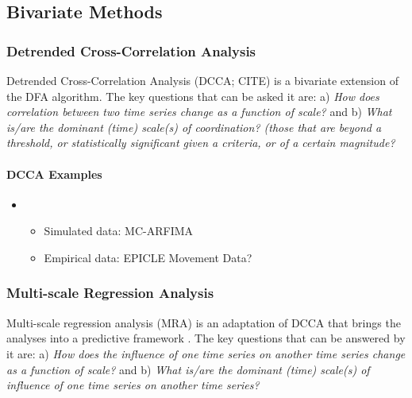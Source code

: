 \documentclass[
  english,
  man]{apa6}
\providecommand{\tightlist}{%
  \setlength{\itemsep}{0pt}\setlength{\parskip}{0pt}}
\let\oldparagraph\paragraph
\renewcommand{\paragraph}[1]{\oldparagraph{#1}\mbox{}}
\begin{document}
\hypertarget{bivariate-methods}{%
\subsection{Bivariate Methods}\label{bivariate-methods}}

\hypertarget{detrended-cross-correlation-analysis}{%
\subsubsection{Detrended Cross-Correlation Analysis}\label{detrended-cross-correlation-analysis}}

Detrended Cross-Correlation Analysis (DCCA; CITE) is a bivariate
extension of the DFA algorithm. The key questions that can be asked it
are: a) \emph{How does correlation between two time series change as a
function of scale?} and b) \emph{What is/are the dominant (time) scale(s) of
coordination? (those that are beyond a threshold, or statistically
significant given a criteria, or of a certain magnitude?}

\hypertarget{dcca-examples}{%
\paragraph{DCCA Examples}\label{dcca-examples}}

\begin{itemize}
\item
  \begin{itemize}
  \tightlist
  \item
    Simulated data: MC-ARFIMA
  \item
    Empirical data: EPICLE Movement Data?
  \end{itemize}
\end{itemize}

\hypertarget{multi-scale-regression-analysis}{%
\subsubsection{Multi-scale Regression Analysis}\label{multi-scale-regression-analysis}}

Multi-scale regression analysis (MRA) is an adaptation of DCCA that
brings the analyses into a predictive framework . The key questions that
can be answered by it are: a) \emph{How does the influence of one time series
on another time series change as a function of scale?} and b) \emph{What
is/are the dominant (time) scale(s) of influence of one time series on
another time series?}
\end{document}
